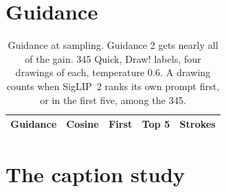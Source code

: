 \documentclass{article}
\begin{document}
\section{Guidance}

\begin{table}[H]
\caption{Guidance at sampling. Guidance 2 gets nearly all of the gain. 345 Quick, Draw! labels, four drawings of each, temperature $0.6$. A drawing counts when SigLIP~2 ranks its own prompt first, or in the first five, among the 345.}
\label{tab:guidance}
\vskip 0.1in
\begin{center}
\begin{small}
\setlength{\tabcolsep}{4pt}
\begin{tabular}{lcccc}
\toprule
Guidance & Cosine & First & Top 5 & Strokes \\
\midrule

\end{tabular}
\end{small}
\end{center}
\vskip -0.1in
\end{table}

\section{The caption study}
\end{document}
